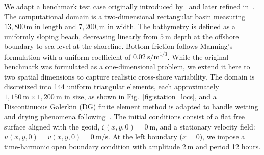 \documentclass[final,1p,times]{elsarticle}
\begin{document}
We adapt a benchmark test case originally introduced by~\cite{Balzano1998} and later refined in~\cite{Karna2011, Dawson2024}. 
The computational domain is a two-dimensional rectangular basin measuring $13{,}800\,\mathrm{m}$ in length and $7,200,\mathrm{m}$ in width. 
The bathymetry is defined as a uniformly sloping beach, decreasing linearly from $5\ \mathrm{m}$ depth at the offshore boundary to sea level at the shoreline. 
Bottom friction follows Manning’s formulation with a uniform coefficient of $0.02 \ \mathrm{s/m}^{1/3}$. 
While the original benchmark was formulated as a one-dimensional problem, we extend it here to two spatial dimensions to capture realistic cross-shore variability. 
The domain is discretized into 144 uniform triangular elements, each approximately $1,150\ \mathrm{m} \times 1,200\ \mathrm{m}$ in size, as shown in Fig.~\ref{fig:station_locs}, and a Discontinuous Galerkin (DG) finite element method is adapted to handle wetting and drying phenomena following~\cite{Dawson2024}. The initial conditions consist of a flat free surface aligned with the geoid, $\zeta(x, y, 0) = 0\ \mathrm{m}$, and a stationary velocity field: $u(x, y, 0) = v(x, y, 0) = 0\ \mathrm{m/s}$.
At the left boundary ($x = 0$), we impose a time-harmonic open boundary condition with amplitude $2\ \mathrm{m}$ and period 12 hours. 
\end{document}
